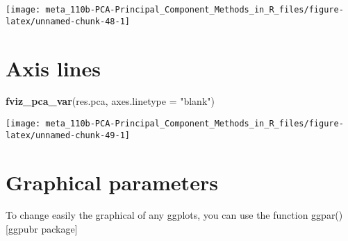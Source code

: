 \documentclass[]{book}
\newenvironment{Shaded}{\begin{snugshade}}{\end{snugshade}}
\newcommand{\DataTypeTok}[1]{\textcolor[rgb]{0.13,0.29,0.53}{#1}}
\newcommand{\KeywordTok}[1]{\textcolor[rgb]{0.13,0.29,0.53}{\textbf{#1}}}
\newcommand{\NormalTok}[1]{#1}
\newcommand{\OperatorTok}[1]{\textcolor[rgb]{0.81,0.36,0.00}{\textbf{#1}}}
\newcommand{\StringTok}[1]{\textcolor[rgb]{0.31,0.60,0.02}{#1}}
\begin{document}
\begin{center}\texttt{[image: meta\_110b-PCA-Principal\_Component\_Methods\_in\_R\_files/figure-latex/unnamed-chunk-48-1]} \end{center}

\hypertarget{axis-lines}{%
\section{Axis lines}\label{axis-lines}}

\begin{Shaded}
\begin{Highlighting}[]
\KeywordTok{fviz_pca_var}\NormalTok{(res.pca, }\DataTypeTok{axes.linetype =} \StringTok{"blank"}\NormalTok{)}
\end{Highlighting}
\end{Shaded}

\begin{center}\texttt{[image: meta\_110b-PCA-Principal\_Component\_Methods\_in\_R\_files/figure-latex/unnamed-chunk-49-1]} \end{center}

\hypertarget{graphical-parameters}{%
\section{Graphical parameters}\label{graphical-parameters}}

To change easily the graphical of any ggplots, you can use the function ggpar() {[}ggpubr package{]}

\begin{Shaded}
\end{Shaded}
\end{document}
